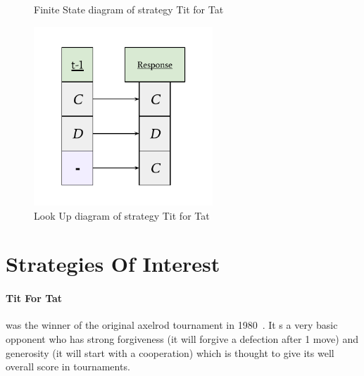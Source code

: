 \begin{figure}[ht]
    \centering
    \begin{minipage}{0.48\textwidth}
        \centering
        \caption{Finite State diagram of strategy Tit for Tat}\label{fig:tit_for_tat_FSD}
    \end{minipage}\hfill
    \begin{minipage}{0.48\textwidth}
        \centering
        \includegraphics[width=0.6\textwidth, center]{./img/examples/tit_for_tat_LUD.pdf}
        \caption{Look Up diagram of strategy Tit for Tat}\label{fig:tit_for_tat_LUD}
    \end{minipage}
\end{figure}


\section{Strategies Of Interest}\label{sec:strategiesOfInterest}
\paragraph{Tit For Tat} was the winner of the original axelrod tournament in 1980~\cite{axelrod1980effective}. It s a very basic opponent who has strong forgiveness (it will forgive a defection after 1 move) and generosity (it will start with a cooperation) which is thought to give its well overall score in tournaments.

